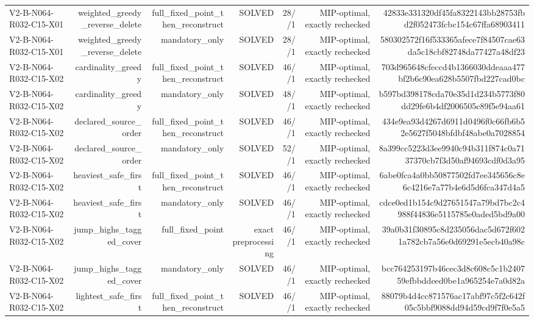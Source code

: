 {\begin{longtable}{lrrrrrr}
V2-B-N064-R032-C15-X01 & weighted\_greedy\_reverse\_delete & full\_fixed\_point\_then\_reconstruct & SOLVED & 28//1 & MIP-optimal, exactly rechecked & 42833e331320df45fa8322143bb28753fbd2f052473fcbc154c67ffa68903411 \\
V2-B-N064-R032-C15-X01 & weighted\_greedy\_reverse\_delete & mandatory\_only & SOLVED & 28//1 & MIP-optimal, exactly rechecked & 580302572f16f533365afece7f84507cae63da5c18cbf82748da77427a48df23 \\
V2-B-N064-R032-C15-X02 & cardinality\_greedy & full\_fixed\_point\_then\_reconstruct & SOLVED & 46//1 & MIP-optimal, exactly rechecked & 703d965648cfeccd4b1366030ddeaaa477bf2b6c90ea628b5507fbd227cad0bc \\
V2-B-N064-R032-C15-X02 & cardinality\_greedy & mandatory\_only & SOLVED & 48//1 & MIP-optimal, exactly rechecked & b597bd398178cda70e35d1d234b5773f80dd29fe6b4df2006505c89f5e94aa61 \\
V2-B-N064-R032-C15-X02 & declared\_source\_order & full\_fixed\_point\_then\_reconstruct & SOLVED & 46//1 & MIP-optimal, exactly rechecked & 434e9ea93d4267d6911d0496f0c66fb6b52e5627f5048bfdbf48abe0a7028854 \\
V2-B-N064-R032-C15-X02 & declared\_source\_order & mandatory\_only & SOLVED & 52//1 & MIP-optimal, exactly rechecked & 8a399cc5223d3ee9940c94b311f874c0a7137370cb7f3d50af94693cdf0d3a95 \\
V2-B-N064-R032-C15-X02 & heaviest\_safe\_first & full\_fixed\_point\_then\_reconstruct & SOLVED & 46//1 & MIP-optimal, exactly rechecked & 6abe0fca4a0bb50877502fd7ee345656c8e6c4216e7a77b4e6d5d6fca347d4a5 \\
V2-B-N064-R032-C15-X02 & heaviest\_safe\_first & mandatory\_only & SOLVED & 46//1 & MIP-optimal, exactly rechecked & cdce0ed1b154c9d27651547a79bd7bc2c4988f44836e5115785e0aded5bd9a00 \\
V2-B-N064-R032-C15-X02 & jump\_highs\_tagged\_cover & full\_fixed\_point & exact preprocessing & 46//1 & MIP-optimal, exactly rechecked & 39a0b31f30895c8d235056dac5d672f6021a782cb7a56e0d69291e5ecb40a98c \\
V2-B-N064-R032-C15-X02 & jump\_highs\_tagged\_cover & mandatory\_only & SOLVED & 46//1 & MIP-optimal, exactly rechecked & bcc764253197b46cec3d8c608c5c1b240759efbbddeed0be1a965254e7a0d82a \\
V2-B-N064-R032-C15-X02 & lightest\_safe\_first & full\_fixed\_point\_then\_reconstruct & SOLVED & 46//1 & MIP-optimal, exactly rechecked & 88079b4d4cc871576ac17abf97c5f2c642f05c5bbf9088dd94d59cd9f7f0e5a5 \\

\end{longtable}}
